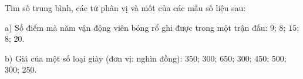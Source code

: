 \begin{ex}
Tìm số trung bình, các tứ phân vị và mốt của các mẫu số liệu sau:

a) Số điểm mà năm vận động viên bóng rổ ghi được trong một trận đấu: $9$; $8$; $15$; $8$; $20$.

b) Giá của một số loại giày (đơn vị: nghìn đồng): $350$; $300$; $650$; $300$; $450$; $500$; $300$; $250$.
\end{ex}
